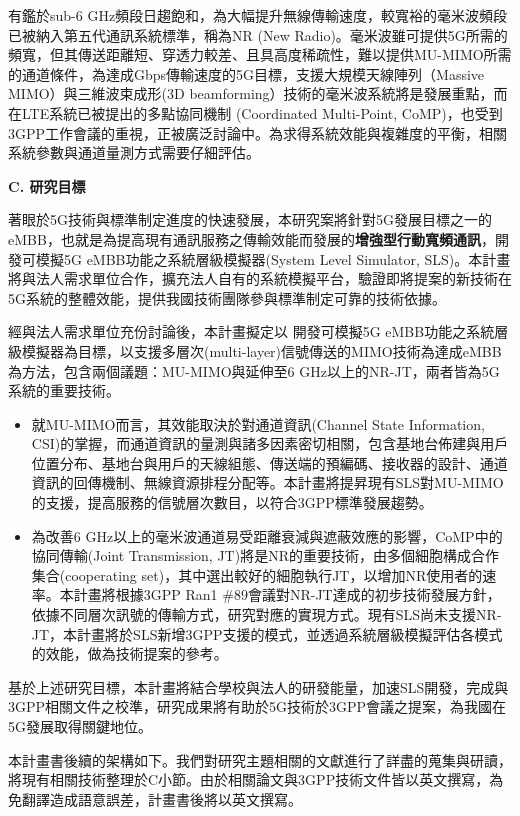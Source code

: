 \documentclass[a4paper,12pt]{article}%
\newcommand\n{\mbox{\quad}} %
\begin{document}
\n 有鑑於sub-6 GHz頻段日趨飽和，為大幅提升無線傳輸速度，較寬裕的毫米波頻段已被納入第五代通訊系統標準，稱為NR (New Radio)。毫米波雖可提供5G所需的頻寬，但其傳送距離短、穿透力較差、且具高度稀疏性，難以提供MU-MIMO所需的通道條件，為達成Gbps傳輸速度的5G目標，支援大規模天線陣列（Massive MIMO）與三維波束成形(3D beamforming）技術的毫米波系統將是發展重點，而在LTE系統已被提出的多點協同機制 (Coordinated Multi-Point, CoMP)，也受到3GPP工作會議的重視，正被廣泛討論中。為求得系統效能與複雜度的平衡，相關系統參數與通道量測方式需要仔細評估。

\noindent \textbf{C. 研究目標}

\n 著眼於5G技術與標準制定進度的快速發展，本研究案將針對5G發展目標之一的eMBB，也就是為提高現有通訊服務之傳輸效能而發展的\textbf{增強型行動寬頻通訊}，開發可模擬5G eMBB功能之系統層級模擬器(System Level Simulator, SLS)。本計畫將與法人需求單位合作，擴充法人自有的系統模擬平台，驗證即將提案的新技術在5G系統的整體效能，提供我國技術團隊參與標準制定可靠的技術依據。

經與法人需求單位充份討論後，本計畫擬定以	開發可模擬5G eMBB功能之系統層級模擬器為目標，以支援多層次(multi-layer)信號傳送的MIMO技術為達成eMBB為方法，包含兩個議題：MU-MIMO與延伸至6 GHz以上的NR-JT，兩者皆為5G系統的重要技術。

\begin{itemize}
\item 就MU-MIMO而言，其效能取決於對通道資訊(Channel State Information, CSI)的掌握，而通道資訊的量測與諸多因素密切相關，包含基地台佈建與用戶位置分布、基地台與用戶的天線組態、傳送端的預編碼、接收器的設計、通道資訊的回傳機制、無線資源排程分配等。本計畫將提昇現有SLS對MU-MIMO的支援，提高服務的信號層次數目，以符合3GPP標準發展趨勢。
\item 為改善6 GHz以上的毫米波通道易受距離衰減與遮蔽效應的影響，CoMP中的協同傳輸(Joint Transmission, JT)將是NR的重要技術，由多個細胞構成合作集合(cooperating set)，其中選出較好的細胞執行JT，以增加NR使用者的速率。本計畫將根據3GPP Ran1 $\#89$會議對NR-JT達成的初步技術發展方針，依據不同層次訊號的傳輸方式，研究對應的實現方式。現有SLS尚未支援NR-JT，本計畫將於SLS新增3GPP支援的模式，並透過系統層級模擬評估各模式的效能，做為技術提案的參考。
\end{itemize}

基於上述研究目標，本計畫將結合學校與法人的研發能量，加速SLS開發，完成與3GPP相關文件之校準，研究成果將有助於5G技術於3GPP會議之提案，為我國在5G發展取得關鍵地位。

本計畫書後續的架構如下。我們對研究主題相關的文獻進行了詳盡的蒐集與研讀，將現有相關技術整理於C小節。由於相關論文與3GPP技術文件皆以英文撰寫，為免翻譯造成語意誤差，計畫書後將以英文撰寫。
\end{document}
